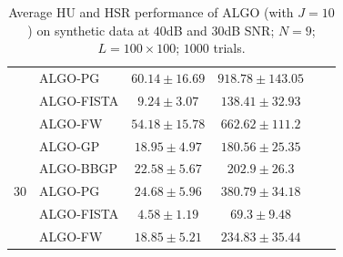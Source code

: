 \begin{table}[h]
\begin{adjustbox}{max width=\textwidth}
\begin{tabular}{|c|l|c|c|c|c|}
                    & ALGO-PG                    & $60.14    \pm 16.69$  & $918.78   \pm 143.05$ \tabularnewline
                    & ALGO-FISTA                 & $9.24     \pm 3.07$   & $138.41   \pm 32.93$  \tabularnewline
                    & ALGO-FW                    & $54.18    \pm 15.78$  & $662.62   \pm 111.2$  \tabularnewline \cline{1-4}
\multirow{5}{*}{30} & ALGO-GP                    & $18.95    \pm 4.97$   & $180.56   \pm 25.35$ \tabularnewline
                    & ALGO-BBGP                  & $22.58    \pm 5.67$   & $202.9    \pm 26.3$  \tabularnewline
                    & ALGO-PG                    & $24.68    \pm 5.96$   & $380.79   \pm 34.18$ \tabularnewline
                    & ALGO-FISTA                 & $4.58     \pm 1.19$   & $69.3     \pm 9.48$  \tabularnewline
                    & ALGO-FW                    & $18.85    \pm 5.21$   & $234.83   \pm 35.44$ \tabularnewline \cline{1-4}
\end{tabular}
\end{adjustbox}
\caption{Average HU and HSR performance of ALGO (with $J=10$) on synthetic
         data at $40$dB and $30$dB SNR; $N = 9$; $L = 100 \times 100$; $1000$
         trials.}
\label{table:results_full_MO9_SNR4030dB_J10}
\end{table}

\newpage

